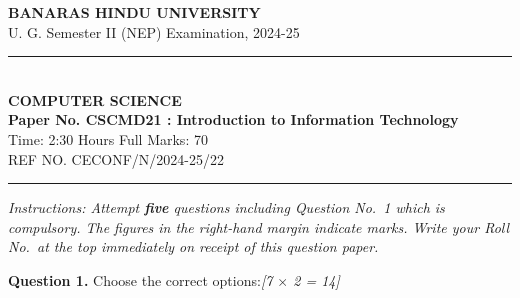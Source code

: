 \documentclass[11pt,a4paper]{article}
\newcommand{\pts}[1]{\hfill \textit{[#1]}}
\begin{document}
\begin{center}
  {\large\bfseries BANARAS HINDU UNIVERSITY}\\[2pt]
  {\normalsize U. G. Semester II (NEP) Examination, 2024-25}\\[6pt]
  \rule{0.8\linewidth}{0.5pt}\\[6pt]
  {\large\bfseries COMPUTER SCIENCE}\\[4pt]
  {\large\bfseries Paper No. CSCMD21 : Introduction to Information Technology}\\[4pt]
  {\normalsize Time: 2:30 Hours \hfill Full Marks: 70}\\[2pt]
  {\small REF NO. CECONF/N/2024-25/22}
\end{center}
\rule{\linewidth}{0.4pt}
\smallskip

\noindent \textit{Instructions: Attempt \textbf{five} questions including Question No.~1 which is compulsory. The figures in the right-hand margin indicate marks. Write your Roll No.\ at the top immediately on receipt of this question paper.}

\bigskip

\noindent \textbf{Question 1.} Choose the correct options:\pts{7 $\times$ 2 = 14}
\end{document}
